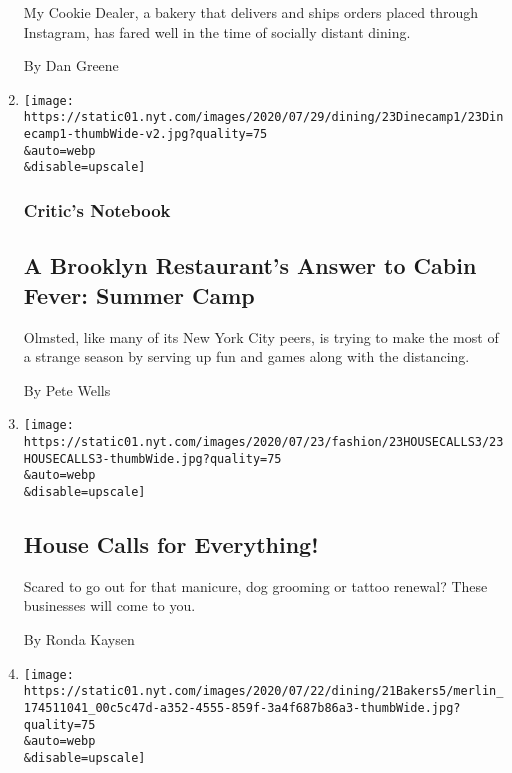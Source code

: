 \begin{enumerate}
  My Cookie Dealer, a bakery that delivers and ships orders placed
  through Instagram, has fared well in the time of socially distant
  dining.

  By Dan Greene
\item
  \href{/2020/07/23/dining/outdoor-dining-olmsted-summer-camp.html}{}

  \texttt{[image: https://static01.nyt.com/images/2020/07/29/dining/23Dinecamp1/23Dinecamp1-thumbWide-v2.jpg?quality=75\\\&auto=webp\\\&disable=upscale]}

  \hypertarget{critics-notebook}{%
  \subsubsection{Critic's Notebook}\label{critics-notebook}}

  \hypertarget{a-brooklyn-restaurants-answer-to-cabin-fever-summer-camp}{%
  \subsection{A Brooklyn Restaurant's Answer to Cabin Fever: Summer
  Camp}\label{a-brooklyn-restaurants-answer-to-cabin-fever-summer-camp}}

  Olmsted, like many of its New York City peers, is trying to make the
  most of a strange season by serving up fun and games along with the
  distancing.

  By Pete Wells
\item
  \href{/2020/07/23/style/coronavirus-manicures-haircuts-tattoos-dog-groomer-at-home.html}{}

  \texttt{[image: https://static01.nyt.com/images/2020/07/23/fashion/23HOUSECALLS3/23HOUSECALLS3-thumbWide.jpg?quality=75\\\&auto=webp\\\&disable=upscale]}

  \hypertarget{house-calls-for-everything}{%
  \subsection{House Calls for
  Everything!}\label{house-calls-for-everything}}

  Scared to go out for that manicure, dog grooming or tattoo renewal?
  These businesses will come to you.

  By Ronda Kaysen
\item
  \href{/2020/07/21/dining/bake-sale-activism-racism.html}{}

  \texttt{[image: https://static01.nyt.com/images/2020/07/22/dining/21Bakers5/merlin\_174511041\_00c5c47d-a352-4555-859f-3a4f687b86a3-thumbWide.jpg?quality=75\\\&auto=webp\\\&disable=upscale]}


\end{enumerate}
